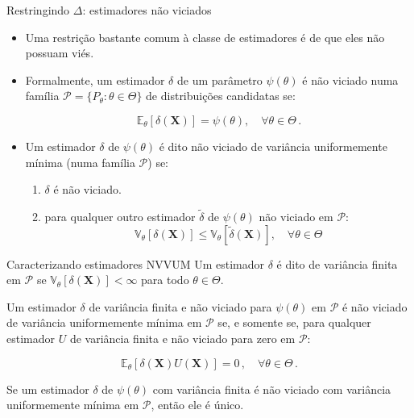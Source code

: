 \documentclass[11pt]{beamer}
\begin{document}
		\begin{frame}{Restringindo $\Delta$: estimadores não viciados}
		\begin{itemize}
			\item Uma restrição bastante comum à classe de estimadores é de que eles não possuam viés.
			\item Formalmente, um estimador $\delta$ de um parâmetro $\psi(\theta)$ é {\color{blue}não viciado} numa família $\mathcal{P} =\{P_\theta: \theta \in \Theta\}$ de distribuições candidatas se:
			
			$$\mathbb{E}_\theta[\delta(\boldsymbol{X})] = \psi(\theta),\quad \forall \theta \in \Theta\, .$$
			\item Um estimador $\delta$ de $\psi(\theta)$ é dito não viciado de variância uniformemente mínima (numa família $\mathcal{P}$) se:
			\begin{enumerate}
				\item $\delta$ é não viciado.
				\item para qualquer outro estimador $\tilde{\delta}$ de $\psi(\theta)$ não viciado em $\mathcal{P}$:
				$$\mathbb{V}_\theta[\delta(\boldsymbol{X})] \leq \mathbb{V}_\theta[\tilde{\delta}(\boldsymbol{X})], \quad \forall \theta \in \Theta$$
			\end{enumerate}			
			
			
			
		\end{itemize}
	\end{frame}
	
		\begin{frame}{Caracterizando estimadores NVVUM}
		Um estimador $\delta$ é dito de variância finita em $\mathcal{P}$ se $\mathbb{V}_\theta[\delta(\boldsymbol{X})] < \infty$ para todo $\theta \in \Theta$. 
		\begin{theorem}
			Um estimador $\delta$ de variância finita e não viciado para  $\psi(\theta)$ em $\mathcal{P}$ é não viciado de variância uniformemente mínima em $\mathcal{P}$ se, e somente se, para qualquer estimador $U$  de variância finita e não viciado para zero em $\mathcal{P}$:
			
			$$\mathbb{E}_\theta[\delta(\boldsymbol{X}) U(\boldsymbol{X})] = 0\, , \quad \forall \theta \in \Theta\, .$$
		\end{theorem}
		\begin{corollary}
			Se um estimador $\delta$ de $\psi(\theta)$ com variância finita é não viciado com variância uniformemente mínima em $\mathcal{P}$, então ele é único.
		\end{corollary}
	\end{frame}
	
\end{document}
